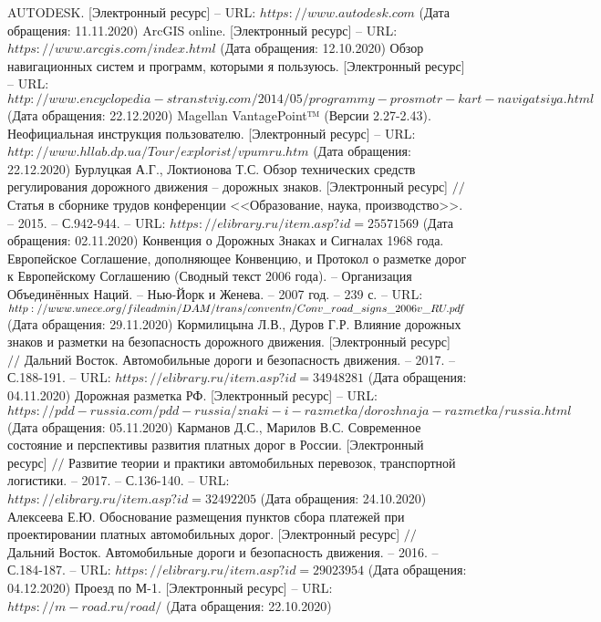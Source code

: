 \begin{thebibliography}{00}
	AUTODESK. [Электронный ресурс] -- URL: $https://www.autodesk.com$ (Дата обращения: 11.11.2020)
	ArcGIS online. [Электронный ресурс] -- URL: $https://www.arcgis.com/index.html$ (Дата обращения: 12.10.2020)
	Обзор навигационных систем и программ, которыми я пользуюсь. [Электронный ресурс] -- URL: $http://www.encyclopedia-stranstviy.com/2014/05/programmy-prosmotr-kart-navigatsiya.html$ (Дата обращения: 22.12.2020)
	Magellan VantagePoint™ (Версии 2.27-2.43). Неофициальная инструкция пользователю. [Электронный ресурс] -- URL: $http://www.hllab.dp.ua/Tour/explorist/vpumru.htm$ (Дата обращения: 22.12.2020)
	Бурлуцкая А.Г., Локтионова Т.С. Обзор технических средств регулирования дорожного движения -- дорожных знаков. [Электронный ресурс] $//$ Статья в сборнике трудов конференции <<Образование, наука, производство>>. -- 2015. -- С.942-944. -- URL: $https://elibrary.ru/item.asp?id=25571569$ (Дата обращения: 02.11.2020)
	Конвенция о Дорожных Знаках и Сигналах 1968 года. Европейское Соглашение, дополняющее Конвенцию, и Протокол о разметке дорог к Европейскому Соглашению (Сводный текст 2006 года). -- Организация Объединённых Наций. -- Нью-Йорк и Женева. -- 2007 год. -- 239 с. -- URL: $http://www.unece.org/fileadmin/DAM/trans/conventn/Conv\_road\_\\
	signs\_2006v\_RU.pdf$ (Дата обращения: 29.11.2020)
	Кормилицына Л.В., Дуров Г.Р. Влияние дорожных знаков и разметки на безопасность дорожного движения. [Электронный ресурс] $//$ Дальний Восток. Автомобильные дороги и безопасность движения. -- 2017. -- С.188-191. -- URL: $https://elibrary.ru/item.asp?id=34948281$ (Дата обращения: 04.11.2020)
	Дорожная разметка РФ. [Электронный ресурс] -- URL: $https://pdd-russia.com/pdd-russia/znaki-i-razmetka/dorozhnaja-razmetka/russia.html$ (Дата обращения: 05.11.2020)
	Карманов Д.С., Марилов В.С. Современное состояние и перспективы развития платных дорог в России. [Электронный ресурс] $//$ Развитие теории и практики автомобильных перевозок, транспортной логистики. -- 2017. -- С.136-140. -- URL: $https://elibrary.ru/item.asp?id=32492205$ (Дата обращения: 24.10.2020)
	Алексеева Е.Ю. Обоснование размещения пунктов сбора платежей при проектировании платных автомобильных дорог. [Электронный ресурс] $//$ Дальний Восток. Автомобильные дороги и безопасность движения. -- 2016. -- С.184-187. -- URL: $https://elibrary.ru/item.asp?id=29023954$ (Дата обращения: 04.12.2020)
	Проезд по М-1. [Электронный ресурс] -- URL: $https://m-road.ru/road/$ (Дата обращения: 22.10.2020)

\end{thebibliography}
